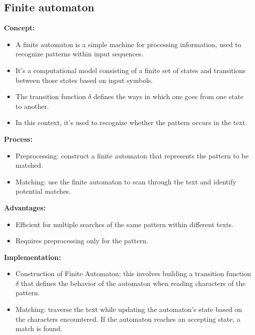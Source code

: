 \documentclass[11pt]{article}
\begin{document}
        \subsection{Finite automaton} \label{subsec:finite_automaton}

            \noindent \textbf{Concept:}
            \begin{itemize}
                \item A finite automaton is a simple machine for processing information, used to recognize patterns within input sequences.
                \item It's a computational model consisting of a finite set of states and transitions between those states based on input symbols.
                \item The transition function $\delta$ defines the ways in which one goes from one state to another.
                \item In this context, it's used to recognize whether the pattern occurs in the text.
            \end{itemize}

            \noindent \textbf{Process:}
            \begin{itemize}
                \item Preprocessing: construct a finite automaton that represents the pattern to be matched.
                \item Matching: use the finite automaton to scan through the text and identify potential matches.
            \end{itemize}

            \noindent \textbf{Advantages:}
            \begin{itemize}
                \item Efficient for multiple searches of the same pattern within different texts.
                \item Requires preprocessing only for the pattern.
            \end{itemize}

            \noindent \textbf{Implementation:}
            \begin{itemize}
                \item Construction of Finite Automaton: this involves building a transition function $\delta$ that defines the behavior of the automaton when reading characters of the pattern.
                \item Matching: traverse the text while updating the automaton's state based on the characters encountered. If the automaton reaches an accepting state, a match is found.
            \end{itemize}
\end{document}
